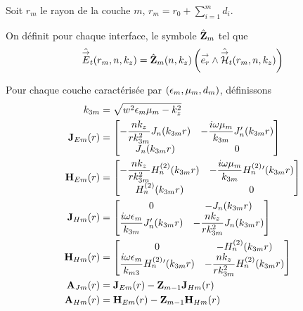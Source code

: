     \begin{figure}[!hbt]
      \centering
      \begin{tikzpicture}
        
      \end{tikzpicture}
    \end{figure}

    Soit \(r_m\) le rayon de la couche \(m\), \(r_m = r_0 +\sum_{i=1}^{m} d_{i}\).

    \begin{defn}
      On définit pour chaque interface, le symbole \(\hat \mZ_m\) tel que
      \begin{equation}
        \hat \vE_t(r_m,n,k_z) = \hat \mZ_m(n,k_z) \left(\vect{e_r} \pvect \hat \vH_t(r_m,n,k_z)\right)
      \end{equation}
    \end{defn}

    Pour chaque couche caractérisée par \((\eps_m,\mu_m,d_m)\), définissons
    \begin{subequations}
      \begin{align}
        k_{3m} &= \sqrt{w^2\eps_m\mu_m - k_z^2}
        \\
        \mJ_{Em}(r) &=
          \begin{bmatrix}
            -\frac{nk_z}{rk_{3m}^2}J_n(k_{3m}r) & -\frac{i\w\mu_m}{k_{3m}}J_n'(k_{3m}r)
            \\
            J_n(k_{3m}r) & 0
          \end{bmatrix}
        \\
        \mH_{Em}(r) &=
          \begin{bmatrix}
            -\frac{nk_z}{rk_{3m}^2}H_n^{(2)}(k_{3m}r) & -\frac{i\w\mu_m}{k_{3m}}H_n^{(2)}{}'(k_{3m}r)
            \\
            H_n^{(2)}(k_{3m}r) & 0
          \end{bmatrix}
        \\
        \mJ_{Hm}(r) &=
          \begin{bmatrix}
            0 & -J_n(k_{3m}r)
            \\
            \frac{i\w\eps_m}{k_{3m}}J_n'(k_{3m}r) & -\frac{nk_z}{rk_{3m}^2}J_n(k_{3m}r)
          \end{bmatrix}
        \\
        \mH_{Hm}(r) &=
          \begin{bmatrix}
            0 & -H_n^{(2)}(k_{3m}r)
            \\
            \frac{i\w\eps_m}{k_{m3}}H_n^{(2)}{}'(k_{3m}r) & -\frac{nk_z}{rk_{3m}^2}H_n^{(2)}(k_{3m}r)
          \end{bmatrix}
        \\
        \mA_{Jm}(r) &= \mJ_{Em}(r) -  \mZ_{m-1} \mJ_{Hm}(r)
        \\
        \mA_{Hm}(r) &= \mH_{Em}(r) -  \mZ_{m-1} \mH_{Hm}(r)
      \end{align}
    \end{subequations}

